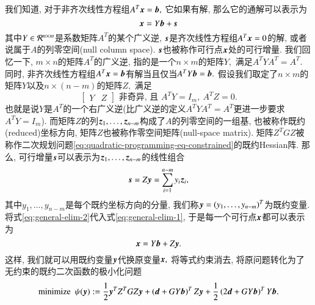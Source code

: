 我们知道, 对于非齐次线性方程组$A^T {\bm{x}} = {\bm{b}},$ 它如果有解, 那么它的通解可以表示为
\begin{equation}
\label{eq:general-elim-1}
{\bm{x}} = Y {\bm{b}} + {\bm{s}}
\end{equation}
其中$Y \in \mathcal{R}^{n\times m}$是系数矩阵$A^T$的某个广义逆, ${\bm{s}}$是齐次线性方程组$A^T {\bm{x}} = 0$的解, 或者说属于$A$的列零空间(null column space). ${\bm{s}}$也被称作可行点${\bm{x}}$处的可行增量. 我们回忆一下, $m\times n$的矩阵$A^T$的广义逆, 指的是一个$n\times m$的矩阵$Y,$ 满足$A^T Y A^T = A^T.$ 同时, 非齐次线性方程组$A^T {\bm{x}} = {\bm{b}}$有解当且仅当$A^T Y {\bm{b}} = {\bm{b}}.$ 假设我们取定了$n \times m$的矩阵$Y$以及$n \times (n-m)$的矩阵$Z,$ 满足
\begin{equation}
\label{eq:eq:general-elim-req}
\begin{bmatrix} Y & Z\end{bmatrix} \text{ 非奇异, 且~} A^T Y = I_m, ~ A^T Z = 0.
\end{equation}
也就是说$Y$是$A^T$的一个右广义逆(比广义逆的定义$A^T Y A^T = A^T$更进一步要求$A^T Y = I_m$). 而矩阵$Z$的列${\bm{z}}_1, \ldots, {\bm{z}}_{n-m}$构成了$A$的列零空间的一组基, 也被称作既约(reduced)坐标方向, 矩阵$Z$也被称作零空间矩阵(null-space matrix). 矩阵$Z^T G Z$被称作二次规划问题\eqref{eq:quadratic-programming-eq-constrained}的既约Hessian阵. 那么, 可行增量${\bm{s}}$可以表示为${\bm{z}}_1, \ldots, {\bm{z}}_{n-m}$的线性组合
\begin{equation}
\label{eq:general-elim-2}
{\bm{s}} = Z {\bm{y}} = \sum\limits_{i=1}^{n-m} y_i {\bm{z}}_i,
\end{equation}
其中$y_1, \ldots, y_{n-m}$是每个既约坐标方向的分量, 我们称${\bm{y}} = (y_1, \ldots, y_{n-m})^T$为既约变量. 将式\eqref{eq:general-elim-2}代入式\eqref{eq:general-elim-1}, 于是每一个可行点${\bm{x}}$都可以表示为
\begin{equation}
\label{eq:general-elim-3}
{\bm{x}} = Y {\bm{b}} + Z {\bm{y}}.
\end{equation}
这样, 我们就可以用既约变量${\bm{y}}$代换原变量${\bm{x}},$ 将等式约束消去, 将原问题转化为了无约束的既约二次函数的极小化问题
\begin{equation}
\label{eq:general-elim-4}
\text{minimize} ~~ \psi({\bm{y}}) := \frac{1}{2} {\bm{y}}^T Z^T G Z {\bm{y}} + \left( {\bm{d}} + G Y {\bm{b}} \right)^T Z {\bm{y}} + \frac{1}{2} \left( 2{\bm{d}} + G Y {\bm{b}} \right)^T Y {\bm{b}}.
\end{equation}

